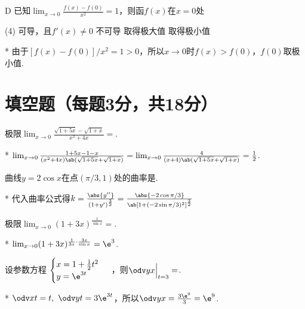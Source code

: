 \begin{choice}{D}
    已知$\lim_{x\to 0}\frac{f(x)-f(0)}{x^2}=1$，则函$f(x)$在$x=0$处
\begin{tasks}(4)
    \task 可导，且$f'(x)\neq 0$
    \task 不可导
    \task 取得极大值
    \task 取得极小值
\end{tasks}
\end{choice}
\begin{solution}*
    由于$[f(x)-f(0)]/x^2=1>0$，所以$x\to 0$时$f(x)>f(0)$，$f(0)$取极小值.
\end{solution}

\section{填空题（每题3分，共18分）}
\begin{problem}
    极限$\lim_{x\to 0}\frac{\sqrt{1+5x}-\sqrt{1+x}}{x^2+4x}=$.
\end{problem}
\begin{solution}*
    $\lim_{x\to0}\frac{1+5x-1-x}{(x^2+4x)\ab(\sqrt{1+5x}+\sqrt{1+x})}=\lim_{x\to 0}\frac{4}{(x+4)\ab(\sqrt{1+5x}+\sqrt{1+x})}=\frac12$.
\end{solution}

\begin{problem}
    曲线$y=2\cos x$在点$(\pi/3,1)$处的曲率是.
\end{problem}
\begin{solution}*
    代入曲率公式得$k=\frac{\abs{y''}}{(1+y')^{\frac32}}=\frac{\abs{-2\cos\pi/3}}{\ab[1+(-2\sin\pi/3)^2]^{\frac32}}$
\end{solution}

\begin{problem}
    极限$\lim_{x\to 0}(1+3x)^{\frac{1}{\sin x}}=$.
\end{problem}
\begin{solution}*
    $\lim_{x\to 0}(1+3x)^{\frac{1}{3x}\cdot\frac{3x}{\sin x}}=\e^3$.
\end{solution}

\begin{problem}
    设参数方程
    $\begin{cases}
        x=1+\frac12t^2\\
        y=\e^{3t}
    \end{cases}$
    ，则$\odv yx\Big|_{t=3}=$.
\end{problem}
\begin{solution}*
    $\odv xt=t,\ \odv yt=3\e^{3t}$，所以$\odv yx=\frac{3\e^9}{3}=\e^9$.
\end{solution}

